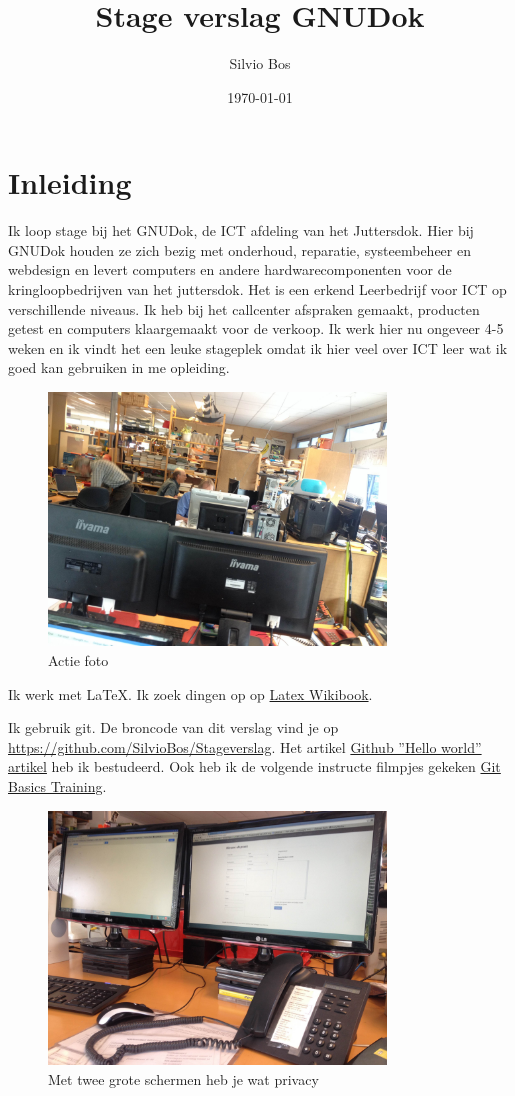 \documentclass[12pt,a4paper]{article}
\begin{document}
\graphicspath{{./images/}}
\title{Stage verslag GNUDok}
\author{Silvio Bos}
\date{\today}
\maketitle
\section{Inleiding}
Ik loop stage bij het GNUDok, de ICT afdeling van het Juttersdok.
Hier bij GNUDok houden ze zich bezig met onderhoud, reparatie, systeembeheer en webdesign en levert computers en andere 
hardwarecomponenten voor de kringloopbedrijven van het juttersdok. 
Het is een erkend Leerbedrijf voor ICT op verschillende niveaus.
Ik heb bij het callcenter afspraken gemaakt, producten getest en computers klaargemaakt voor de verkoop.
Ik werk hier nu ongeveer 4-5 weken en ik vindt het een leuke stageplek omdat ik hier veel over ICT leer wat ik goed kan gebruiken in me opleiding.

\begin{figure}[H]
\centering
\includegraphics[width=0.80\textwidth]{IMG_4398}
\caption{Actie foto}
\end{figure}

Ik werk met \LaTeX{}.  Ik zoek dingen op op \href{https://en.wikibooks.org/wiki/LaTeX}{Latex Wikibook}.

Ik gebruik git.  De broncode van dit verslag vind je op \url{https://github.com/SilvioBos/Stageverslag}. Het artikel \href{https://guides.github.com/activities/hello-world/}{Github ''Hello world'' artikel} heb ik bestudeerd.  
Ook heb ik de volgende instructe filmpjes gekeken \href{https://www.youtube.com/watch?v=8oRjP8yj2Wo&list=PLg7s6cbtAD165JTRsXh8ofwRw0PqUnkVH}{Git Basics Training}.

\begin{figure}[H]
\centering
\includegraphics[width=0.80\textwidth]{IMG_4399}
\caption{Met twee grote schermen heb je wat privacy}
\end{figure}
\end{document}
